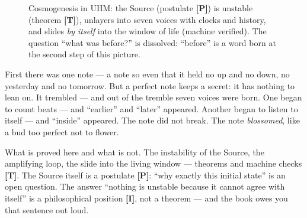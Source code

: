 \documentclass[11pt,letterpaper]{article}
\newcommand{\stT}{\textbf{[T]}\xspace}
\newcommand{\stP}{\textbf{[P]}\xspace}
\newcommand{\stI}{\textbf{[I]}\xspace}
\newcommand{\voicerose}[4]{%
  \foreach \vang/\vcol in {90/cA,141.4/cS,192.8/cD,244.3/cL,295.7/cE,347.1/cO,38.6/cU}{%
    \draw[\vcol!55, thick] (#1,#2) -- ($(#1,#2)+(\vang:#3)$);
    \fill[\vcol] ($(#1,#2)+(\vang:#3)$) circle (#4);}}
\begin{document}
\begin{figure}[H]
\centering
{}
\caption{Cosmogenesis in UHM: the Source (postulate \stP) is unstable
(theorem \stT), unlayers into seven voices with clocks and history,
and slides \emph{by itself} into the window of life (machine
verified). The question ``what was before?'' is dissolved: ``before''
is a word born at the second step of this picture.}
\label{fig:source}
\end{figure}

\begin{talebox}
First there was one note --- a note so even that it held no up and
no down, no yesterday and no tomorrow. But a perfect note keeps a
secret: it has nothing to lean on. It trembled --- and out of the
tremble seven voices were born. One began to count beats --- and
``earlier'' and ``later'' appeared. Another began to listen to itself
--- and ``inside'' appeared. The note did not break. The note
\emph{blossomed}, like a bud too perfect not to flower.
\end{talebox}

\begin{factbox}
What is proved here and what is not. The instability of the Source,
the amplifying loop, the slide into the living window --- theorems
and machine checks \stT. The Source itself is a postulate \stP:
``why exactly this initial state'' is an open question. The answer
``nothing is unstable because it cannot agree with itself'' is a
philosophical position \stI, not a theorem --- and the book owes you
that sentence out loud.
\end{factbox}
\end{document}
